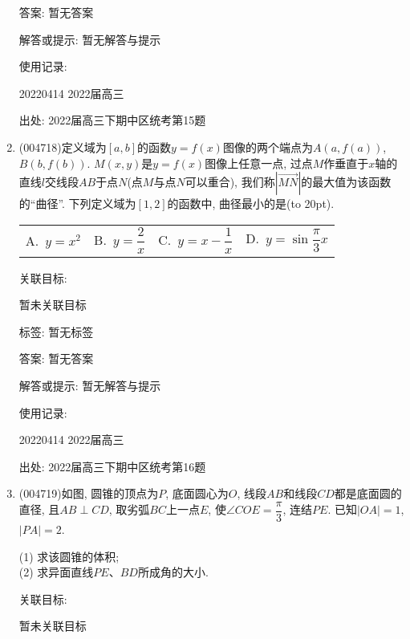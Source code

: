 \documentclass[10pt,a4paper]{article}
\newcommand{\bracket}[1]{(\hbox to #1pt{})}
\newcommand{\fourch}[4]{\par\begin{tabular}{p{.23\textwidth}p{.23\textwidth}p{.23\textwidth}p{.23\textwidth}}
A.~#1 &B.~#2& C.~#3& D.~#4
\end{tabular}}
\begin{document}
\begin{enumerate}[1.]
答案: 暂无答案

解答或提示: 暂无解答与提示

使用记录:

20220414	2022届高三	


出处: 2022届高三下期中区统考第15题
\item { (004718)}定义域为$[a,b]$的函数$y=f(x)$图像的两个端点为$A(a,f(a))$, $B(b,f(b))$. $M(x,y)$是$y=f(x)$图像上任意一点, 过点$M$作垂直于$x$轴的直线$l$交线段$AB$于点$N$(点$M$与点$N$可以重合), 我们称$|\overrightarrow{MN}|$的最大值为该函数的``曲径''. 下列定义域为$[1,2]$的函数中, 曲径最小的是\bracket{20}.
\fourch{$y=x^2$}{$y=\dfrac 2x$}{$y=x-\dfrac 1x$}{$y=\sin \dfrac\pi 3 x$}


关联目标:

暂未关联目标



标签: 暂无标签

答案: 暂无答案

解答或提示: 暂无解答与提示

使用记录:

20220414	2022届高三	


出处: 2022届高三下期中区统考第16题
\item { (004719)}如图, 圆锥的顶点为$P$, 底面圆心为$O$, 线段$AB$和线段$CD$都是底面圆的直径, 且$AB\perp CD$, 取劣弧$BC$上一点$E$, 使$\angle COE=\dfrac\pi 3$, 连结$PE$. 已知$|OA|=1$, $|PA|=2$.
\begin{center}
\end{center}
(1) 求该圆锥的体积;\\
(2) 求异面直线$PE$、$BD$所成角的大小.


关联目标:

暂未关联目标




\end{enumerate}
\end{document}
